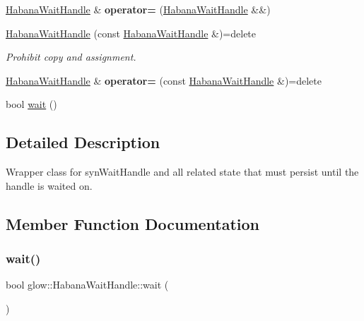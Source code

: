 \begin{DoxyCompactItemize}
\mbox{\label{classglow_1_1_habana_wait_handle_a167510ecfeb5172de628309e539ed49e}} 
\hyperlink{classglow_1_1_habana_wait_handle}{Habana\+Wait\+Handle} \& {\bfseries operator=} (\hyperlink{classglow_1_1_habana_wait_handle}{Habana\+Wait\+Handle} \&\&)
\item 
\mbox{\label{classglow_1_1_habana_wait_handle_af2353bd0a1f814845bbb9a216a46e14f}} 
\hyperlink{classglow_1_1_habana_wait_handle_af2353bd0a1f814845bbb9a216a46e14f}{Habana\+Wait\+Handle} (const \hyperlink{classglow_1_1_habana_wait_handle}{Habana\+Wait\+Handle} \&)=delete
\begin{DoxyCompactList}\small\item\em Prohibit copy and assignment. \end{DoxyCompactList}\item 
\mbox{\label{classglow_1_1_habana_wait_handle_af2bb79e423353e4d92b1b3fc37516cac}} 
\hyperlink{classglow_1_1_habana_wait_handle}{Habana\+Wait\+Handle} \& {\bfseries operator=} (const \hyperlink{classglow_1_1_habana_wait_handle}{Habana\+Wait\+Handle} \&)=delete
\item 
bool \hyperlink{classglow_1_1_habana_wait_handle_abe89943429bca91c7a0f796fb12c4548}{wait} ()
\end{DoxyCompactItemize}


\subsection{Detailed Description}
Wrapper class for syn\+Wait\+Handle and all related state that must persist until the handle is waited on. 

\subsection{Member Function Documentation}
\mbox{\label{classglow_1_1_habana_wait_handle_abe89943429bca91c7a0f796fb12c4548}} 
\subsubsection{\texorpdfstring{wait()}{wait()}}
{\footnotesize\ttfamily bool glow\+::\+Habana\+Wait\+Handle\+::wait (\begin{DoxyParamCaption}{ }\end{DoxyParamCaption})}

